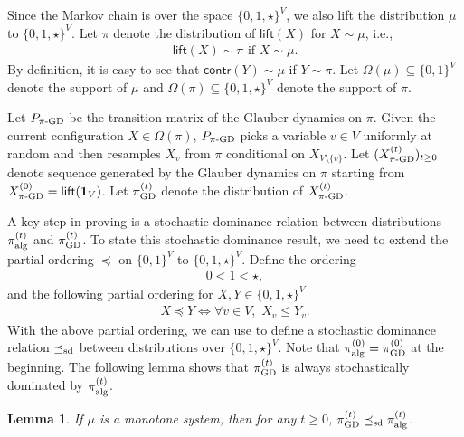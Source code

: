 \documentclass[11pt,a4paper]{article}
\newcommand{\sd}{\preceq_{\textnormal{sd}}}
\newtheorem{lemma}[theorem]{Lemma}
\theoremstyle{definition}
\def\*#1{\mathbf{#1}} %
\begin{document}
Since the Markov chain is over the space $\{0,1,\star\}^V$, we also lift the distribution $\mu$ to $\{0,1,\star\}^V$. Let $\pi$ denote the distribution of $\textsf{lift}(X)$ for $X \sim \mu$, i.e., 
\begin{align}\label{eq:lift-pi}
    \textsf{lift}(X) \sim \pi \text{ if } X \sim \mu.
\end{align}
By definition, it is easy to see that $\textsf{contr}(Y) \sim \mu$ if $Y \sim \pi$.
Let $\Omega(\mu) \subseteq \{0,1\}^V$ denote the support of $\mu$ and $\Omega(\pi) \subseteq \{0,1,\star\}^V$ denote the support of $\pi$.

Let $P_{\pi\textnormal{-GD}}$ be the transition matrix of the Glauber dynamics on $\pi$. Given the current configuration $X \in \Omega(\pi)$, $P_{\pi\textnormal{-GD}}$ picks a variable $v \in V$ uniformly at random and then resamples $X_v$ from $\pi$ conditional on $X_{V \setminus \{v\}}$. Let $(X^{(t)}_{\pi\textnormal{-GD}})_{t \geq 0}$ denote sequence generated by the Glauber dynamics on $\pi$ starting from $X^{(0)}_{\pi\textnormal{-GD}}= \textsf{lift}(\*1_V)$. Let $\pi^{(t)}_{\textnormal{GD}}$ denote the distribution of $X^{(t)}_{\pi\textnormal{-GD}}$.

A key step in proving  is a stochastic dominance relation between distributions $\pi^{(t)}_{\textnormal{alg}}$ and $\pi^{(t)}_{\textnormal{GD}}$.
To state this stochastic dominance result,
we need to extend the partial ordering $\preceq$ on $\{0,1\}^V$ to $\{0,1,\star\}^V$. 
Define the ordering
\begin{align*}
    0 < 1 < \star,
\end{align*}
and the following partial ordering for $X,Y \in \{0,1,\star\}^V$
\begin{align*}
    X \preceq Y \iff \forall v \in V, \,\, X_v \leq Y_v.
\end{align*}
With the above partial ordering, we can use  to define a stochastic dominance relation $\sd$ between distributions over $\{0,1,\star\}^V$.
Note that $\pi^{(0)}_{\textnormal{alg}}=\pi^{(0)}_{\textnormal{GD}}$ at the beginning. The following lemma shows that $\pi^{(t)}_{\textnormal{GD}}$ is always stochastically dominated by $\pi^{(t)}_{\textnormal{alg}}$. 

\begin{lemma}\label{lem:stochastic-dominance}
If $\mu$ is a monotone system, then for any $t \geq 0$, $\pi^{(t)}_{\textnormal{GD}} \sd \pi^{(t)}_{\textnormal{alg}}$.
\end{lemma}
\end{document}
